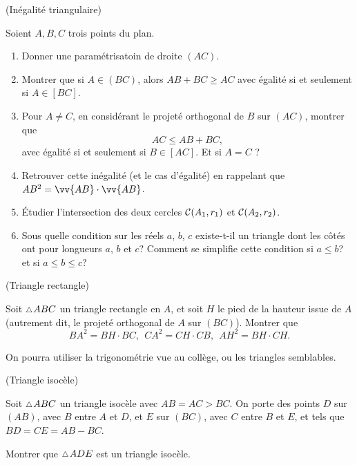 \documentclass[a4paper,11pt,reqno]{amsart}
\begin{document}
\begin{exo} (Inégalité triangulaire)

  Soient $A,B,C$ trois points du plan.
  \begin{enumerate}
    \item Donner une paramétrisatoin de droite $(AC)$.
    \item Montrer que si $A \in (BC)$, alors $AB+BC \geq AC$ avec égalité si et seulement si $A \in [BC]$.
    \item Pour $A \neq C$, en considérant le projeté orthogonal de $B$ sur $(AC)$, montrer que
    \[
      AC \leqslant AB+BC,
    \]
    avec égalité si et seulement si $B \in [AC]$. Et si $A=C$ ?
    \item Retrouver cette inégalité (et le cas d'égalité) en rappelant que $AB^{2}=\vv{AB}\cdot\vv{AB}$.
    \item Étudier l'intersection des deux cercles $\mathcal{C}(A_1,r_1)$ et $\mathcal{C}(A_2,r_2)$.
    \item Sous quelle condition sur les réels $a$, $b$, $c$ existe-t-il un triangle dont les côtés ont pour longueurs $a$, $b$ et $c$? Comment se simplifie cette condition si $a \leqslant b$? et si $a \leqslant b \leqslant c$?
  \end{enumerate}
\end{exo}


\begin{exo} (Triangle rectangle)

  Soit $\tri ABC$ un triangle rectangle en $A$, et soit $H$ le pied de la hauteur issue de $A$ (autrement dit, le projeté orthogonal de $A$ sur $(BC)$).  Montrer que
  \[
    BA^2=BH \cdot BC,\ \ CA^2=CH \cdot CB,\ \ AH^2=BH \cdot CH.
  \]
  \begin{indication}
    On pourra utiliser la trigonométrie vue au collège, ou les triangles semblables.
  \end{indication}
\end{exo}


\begin{exo} (Triangle isocèle)

  Soit $\tri ABC$ un triangle isocèle avec $AB=AC > BC$. On porte des points $D$ sur $(AB)$, avec $B$ entre $A$ et $D$, et $E$ sur $(BC)$, avec $C$ entre $B$ et $E$, et tels que $BD=CE=AB-BC$.

  Montrer que $\tri ADE$ est un triangle isocèle.
\end{exo}
\end{document}
